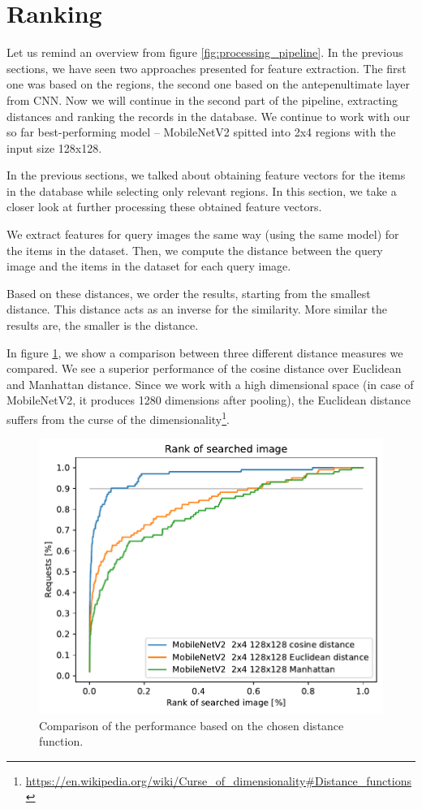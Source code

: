 \section{Ranking}

Let us remind an overview from figure \ref{fig:processing_pipeline}. In the previous sections, we have seen two approaches presented for feature extraction. The first one was based on the regions, the second one based on the antepenultimate layer from CNN. Now we will continue in the second part of the pipeline, extracting distances and ranking the records in the database. We continue to work with our so far best-performing model -- MobileNetV2 spitted into 2x4 regions with the input size 128x128.

In the previous sections, we talked about obtaining feature vectors for the items in the database while selecting only relevant regions. In this section, we take a closer look at further processing these obtained feature vectors.

We extract features for query images the same way (using the same model) for the items in the dataset. Then, we compute the distance between the query image and the items in the dataset for each query image.

Based on these distances, we order the results, starting from the smallest distance. This distance acts as an inverse for the similarity. More similar the results are, the smaller is the distance.

In figure \ref{fig:regions_distances}, we show a comparison between three different distance measures we compared. We see a superior performance of the cosine distance over Euclidean and Manhattan distance. Since we work with a high dimensional space (in case of MobileNetV2, it produces 1280 dimensions after pooling), the Euclidean distance suffers from the curse of the dimensionality\footnote{\url{https://en.wikipedia.org/wiki/Curse\_of\_dimensionality\#Distance\_functions}}. 

\begin{figure}
    \centering
    \includegraphics[width=0.8\linewidth]{graphs/3aab502ea602a9f49afaa0a0d998cf226a0a67b9efcaa655d2ddf5063eeabe47.pdf}
    \caption{Comparison of the performance based on the chosen distance function.}
    \label{fig:regions_distances}
\end{figure}

